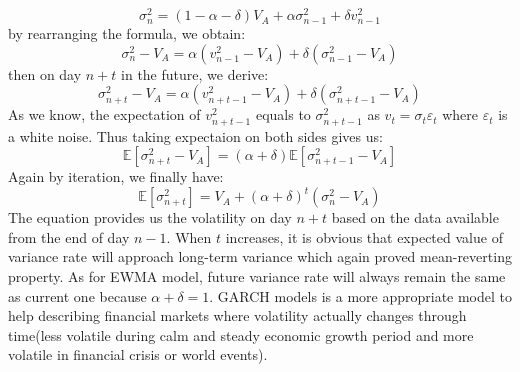 \squeezeupu
\begin{equation}
\sigma_n^2=(1-\alpha-\delta)V_A+\alpha\sigma_{n-1}^2+\delta v_{n-1}^2 \nonumber
\end{equation} 
\squeezeupu
by rearranging the formula, we obtain:
\begin{equation}
\sigma_n^2-V_A=\alpha(v_{n-1}^2-V_A)+\delta(\sigma_{n-1}^2-V_A) \nonumber
\end{equation} 
then on day $n+t$ in the future, we derive:
\squeezeupu
\begin{equation}
\sigma_{n+t}^2-V_A=\alpha(v_{n+t-1}^2-V_A)+\delta(\sigma_{n+t-1}^2-V_A) \nonumber
\end{equation} 
As we know, the expectation of $v_{n+t-1}^2$ equals to $\sigma_{n+t-1}^2$ as $v_{t}=\sigma_{t}\varepsilon_{t}$ where $\varepsilon_{t}$ is a white noise. Thus taking expectaion on both sides gives us:
\squeezeupu
\begin{equation}
\mathbb{E}[\sigma_{n+t}^2-V_A]=(\alpha+\delta)\mathbb{E}[\sigma_{n+t-1}^2-V_A] \nonumber
\end{equation} 
Again by iteration, we finally have:
\squeezeupu
\begin{equation}
\mathbb{E}[\sigma_{n+t}^2]=V_A+(\alpha+\delta)^t(\sigma_n^2-V_A)
\end{equation} 
The equation provides us the volatility on day $n+t$ based on the data available from the end of day $n-1$. When $t$ increases, it is obvious that expected value of variance rate will approach long-term variance which again proved mean-reverting property. As for EWMA model, future variance rate will always remain the same as current one because $\alpha+\delta=1$. 
GARCH models is a more appropriate model to help describing financial markets where volatility actually changes through time(less volatile during calm and steady economic growth period and more volatile in financial crisis or world events). 

